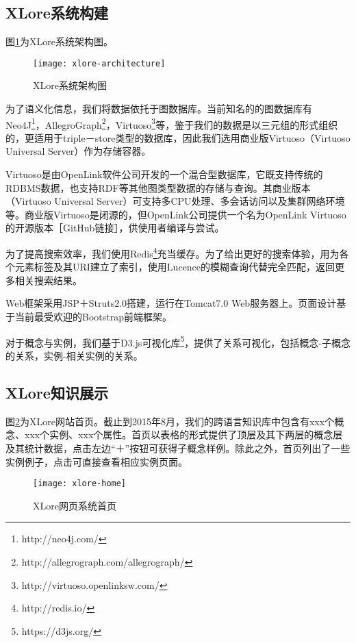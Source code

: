 \subsection{XLore系统构建}
图\ref{fig:xlore-architecture}为XLore系统架构图。

\begin{figure}[H] 
  \centering
  \texttt{[image: xlore-architecture]}
  \caption{XLore系统架构图}
  \label{fig:xlore-architecture}
\end{figure}

为了语义化信息，我们将数据依托于图数据库。当前知名的的图数据库有Neo4J\footnote{http://neo4j.com/}，AllegroGraph\footnote{http://allegrograph.com/allegrograph/}，Virtuoso\footnote{http://virtuoso.openlinksw.com/}等，鉴于我们的数据是以三元组的形式组织的，更适用于triple－store类型的数据库，因此我们选用商业版Virtuoso（Virtuoso Universal Server）作为存储容器。

Virtuoso是由OpenLink软件公司开发的一个混合型数据库，它既支持传统的RDBMS数据，也支持RDF等其他图类型数据的存储与查询。其商业版本（Virtuoso Universal Server）可支持多CPU处理、多会话访问以及集群网络环境等。商业版Virtuoso是闭源的，但OpenLink公司提供一个名为OpenLink Virtuoso的开源版本［GitHub链接］，供使用者编译与尝试。

为了提高搜索效率，我们使用Redis\footnote{http://redis.io/}充当缓存。为了给出更好的搜索体验，用为各个元素标签及其URI建立了索引，使用Lucence的模糊查询代替完全匹配，返回更多相关搜索结果。

Web框架采用JSP＋Struts2.0搭建，运行在Tomcat7.0 Web服务器上。页面设计基于当前最受欢迎的Bootstrap前端框架。

对于概念与实例，我们基于D3.js可视化库\footnote{https://d3js.org/}，提供了关系可视化，包括概念-子概念的关系，实例-相关实例的关系。

\subsection{XLore知识展示}
图\ref{fig:xlore-home}为XLore网站首页。截止到2015年8月，我们的跨语言知识库中包含有xxx个概念、xxx个实例、xxx个属性。首页以表格的形式提供了顶层及其下两层的概念层及其统计数据，点击左边“＋”按钮可获得子概念样例。除此之外，首页列出了一些实例例子，点击可直接查看相应实例页面。

\begin{figure}[H] 
  \centering
  \texttt{[image: xlore-home]}
  \caption{XLore网页系统首页}
  \label{fig:xlore-home}
\end{figure}

